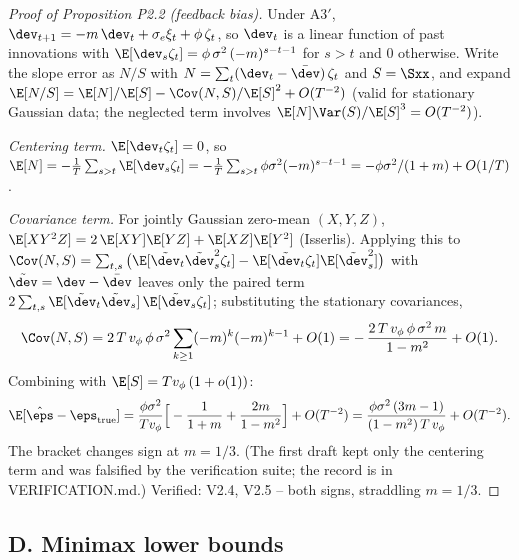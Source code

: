 \documentclass[11pt]{article}
\begin{document}
\begin{proof}[Proof of Proposition P2.2 (feedback bias)]
Under A3$'$, $\dev_{t+1} = -m\,\dev_t + \sigma_e \xi_t + \phi\,\zeta_t$, so
$\dev_t$ is a linear function of past innovations with
$\E[\dev_s \zeta_t] = \phi\,\sigma^2\,(-m)^{s-t-1}$ for $s > t$ and $0$
otherwise. Write the slope error as $N/S$ with
$N = \sum_t (\dev_t - \bar\dev)\,\zeta_t$ and $S = \Sxx$, and expand
$\E[N/S] = \E[N]/\E[S] - \Cov(N, S)/\E[S]^2 + O(T^{-2})$ (valid for
stationary Gaussian data; the neglected term involves
$\E[N]\Var(S)/\E[S]^3 = O(T^{-2})$).

\emph{Centering term.} $\E[\dev_t \zeta_t] = 0$, so
$\E[N] = -\tfrac{1}{T}\sum_{s>t}\E[\dev_s\zeta_t]
= -\tfrac{1}{T}\sum_{s>t}\phi\sigma^2(-m)^{s-t-1}
= -\phi\sigma^2/(1+m) + O(1/T)$.

\emph{Covariance term.} For jointly Gaussian zero-mean $(X, Y, Z)$,
$\E[XY^2Z] = 2\,\E[XY]\E[YZ] + \E[XZ]\E[Y^2]$ (Isserlis). Applying this to
$\Cov(N, S) = \sum_{t,s}\big(\E[\tilde\dev_t \tilde\dev_s^2 \zeta_t] -
\E[\tilde\dev_t\zeta_t]\E[\tilde\dev_s^2]\big)$ with
$\tilde\dev = \dev - \bar\dev$ leaves only the paired term
$2\sum_{t,s}\E[\tilde\dev_t\tilde\dev_s]\,\E[\tilde\dev_s\zeta_t]$;
substituting the stationary covariances,
\[
\Cov(N,S) = 2\,T\,v_\phi\,\phi\,\sigma^2 \sum_{k \ge 1} (-m)^{k}(-m)^{k-1}
 + O(1)
 = -\,\frac{2\,T\,v_\phi\,\phi\,\sigma^2\,m}{1-m^2} + O(1).
\]
Combining with $\E[S] = T v_\phi\,(1+o(1))$:
\[
\E[\hat\eps - \eps_{\mathrm{true}}]
 = \frac{\phi\sigma^2}{T v_\phi}\Big[-\frac{1}{1+m} + \frac{2m}{1-m^2}\Big]
 + O(T^{-2})
 = \frac{\phi\sigma^2\,(3m-1)}{(1-m^2)\,T\,v_\phi} + O(T^{-2}).
\]
The bracket changes sign at $m = 1/3$. (The first draft kept only the
centering term and was falsified by the verification suite; the record is
in VERIFICATION.md.) Verified: V2.4, V2.5 -- both signs, straddling
$m = 1/3$.
\end{proof}

\subsection*{D. Minimax lower bounds}
\end{document}
